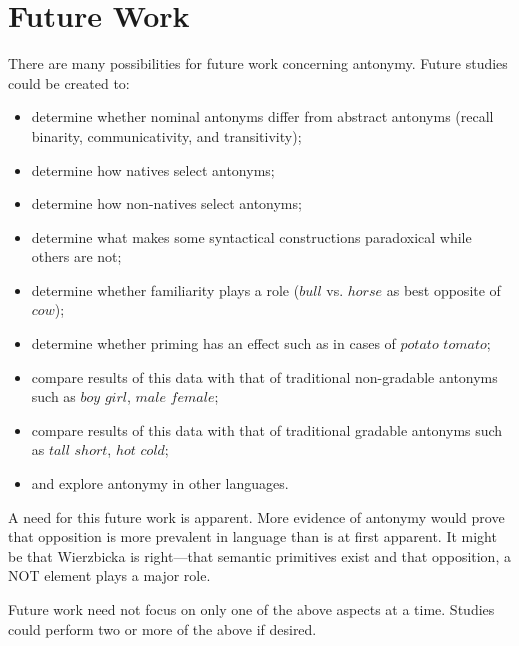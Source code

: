 \section {Future Work}
There are many possibilities for future work concerning antonymy.  Future studies could be created to:
	\begin {itemize}
		\item determine whether nominal antonyms differ from abstract antonyms (recall binarity, communicativity, and transitivity);
		\item determine how natives select antonyms;
		\item determine how non-natives select antonyms;
		\item determine what makes some syntactical constructions paradoxical while others are not;
		\item determine whether familiarity plays a role ($bull$ vs. $horse$ as best opposite of $cow$);
		\item determine whether priming has an effect such as in cases of $potato$ \opp $tomato$;
		\item compare results of this data with that of traditional non-gradable antonyms such as $boy$ \opp $girl$, $male$ \opp $female$;
		\item compare results of this data with that of traditional gradable antonyms such as $tall$ \opp $short$, $hot$ \opp $cold$;
		\item and explore antonymy in other languages.  
	\end {itemize}
A need for this future work is apparent.  More evidence of antonymy would prove that opposition is more prevalent in language than is at first apparent.  It might be that Wierzbicka is right—that semantic primitives exist and that opposition, a NOT element plays a major role.

Future work need not focus on only one of the above aspects at a time.  Studies could perform two or more of the above if desired.

